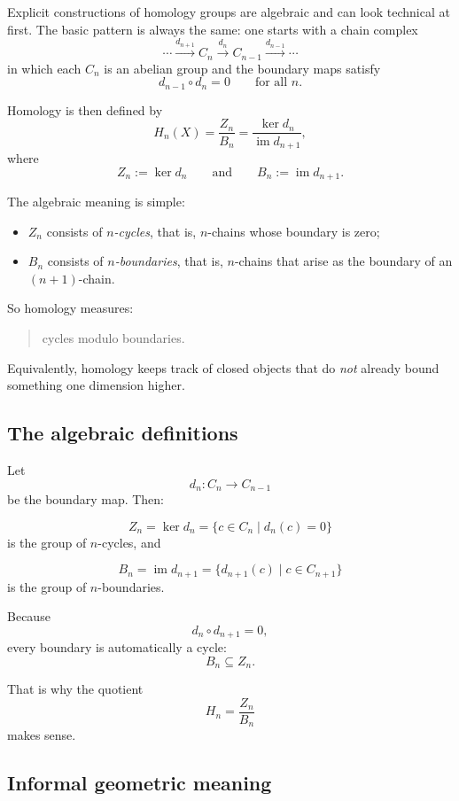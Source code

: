 \documentclass[12pt,a4paper]{article}
\theoremstyle{notespace}
\begin{document}
Explicit constructions of homology groups are algebraic and can look technical at first. The basic pattern is always the same: one starts with a chain complex
\[
\cdots \xrightarrow{d_{n+1}} C_n \xrightarrow{d_n} C_{n-1} \xrightarrow{d_{n-1}} \cdots
\]
in which each \(C_n\) is an abelian group and the boundary maps satisfy
\[
d_{n-1}\circ d_n = 0
\qquad \text{for all } n.
\]

Homology is then defined by
\[
H_n(X)=\frac{Z_n}{B_n}
=
\frac{\ker d_n}{\operatorname{im} d_{n+1}},
\]
where
\[
Z_n:=\ker d_n
\qquad \text{and} \qquad
B_n:=\operatorname{im} d_{n+1}.
\]

The algebraic meaning is simple:

\begin{itemize}
	\item \(Z_n\) consists of \emph{\(n\)-cycles}, that is, \(n\)-chains whose boundary is zero;
	\item \(B_n\) consists of \emph{\(n\)-boundaries}, that is, \(n\)-chains that arise as the boundary of an \((n+1)\)-chain.
\end{itemize}

So homology measures:

\begin{quote}
	cycles modulo boundaries.
\end{quote}

Equivalently, homology keeps track of closed objects that do \emph{not} already bound something one dimension higher.

\subsection{ The algebraic definitions}

Let
\[
d_n:C_n\to C_{n-1}
\]
be the boundary map. Then:

\[
Z_n=\ker d_n=\{c\in C_n \mid d_n(c)=0\}
\]
is the group of \(n\)-cycles, and

\[
B_n=\operatorname{im} d_{n+1}
=
\{d_{n+1}(c)\mid c\in C_{n+1}\}
\]
is the group of \(n\)-boundaries.

Because
\[
d_n\circ d_{n+1}=0,
\]
every boundary is automatically a cycle:
\[
B_n\subseteq Z_n.
\]

That is why the quotient
\[
H_n=\frac{Z_n}{B_n}
\]
makes sense.

\subsection{ Informal geometric meaning}
\end{document}
